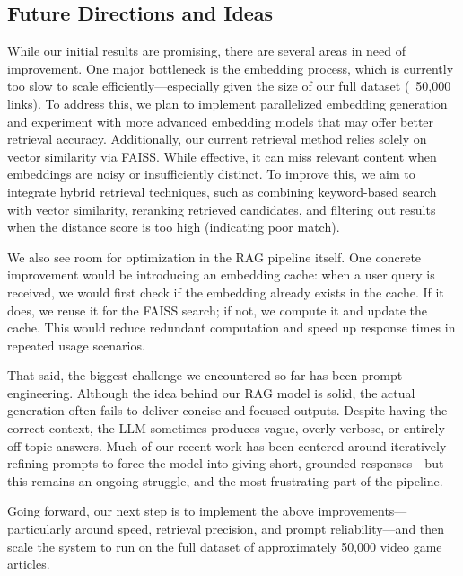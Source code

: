 \documentclass[fleqn,moreauthors,10pt]{ds_report}
\begin{document}
\subsection*{Future Directions and Ideas}
While our initial results are promising, there are several areas in need of improvement. One major bottleneck is the embedding process, which is currently too slow to scale efficiently—especially given the size of our full dataset (~50,000 links). To address this, we plan to implement parallelized embedding generation and experiment with more advanced embedding models that may offer better retrieval accuracy. Additionally, our current retrieval method relies solely on vector similarity via FAISS. While effective, it can miss relevant content when embeddings are noisy or insufficiently distinct. To improve this, we aim to integrate hybrid retrieval techniques, such as combining keyword-based search with vector similarity, reranking retrieved candidates, and filtering out results when the distance score is too high (indicating poor match).

We also see room for optimization in the RAG pipeline itself. One concrete improvement would be introducing an embedding cache: when a user query is received, we would first check if the embedding already exists in the cache. If it does, we reuse it for the FAISS search; if not, we compute it and update the cache. This would reduce redundant computation and speed up response times in repeated usage scenarios.

That said, the biggest challenge we encountered so far has been prompt engineering. Although the idea behind our RAG model is solid, the actual generation often fails to deliver concise and focused outputs. Despite having the correct context, the LLM sometimes produces vague, overly verbose, or entirely off-topic answers. Much of our recent work has been centered around iteratively refining prompts to force the model into giving short, grounded responses—but this remains an ongoing struggle, and the most frustrating part of the pipeline.

Going forward, our next step is to implement the above improvements—particularly around speed, retrieval precision, and prompt reliability—and then scale the system to run on the full dataset of approximately 50,000 video game articles.


\end{document}
